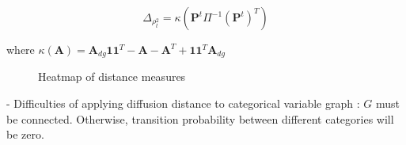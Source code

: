 \documentclass[12pt]{report}
\begin{document}
$$\Delta_{\rho^{2}_{t}} = \kappa(\textbf{P}^{t} \Pi^{-1} (\textbf{P}^{t})^{T} )$$
 
where $\kappa(\textbf{A}) = \textbf{A}_{dg} \textbf{1} \textbf{1}^{T} - \textbf{A} - \textbf{A}^{T} + \textbf{1} \textbf{1}^{T} \textbf{A}_{dg}$ 

 
\begin{figure}[H]
\captionsetup{format=plain}
\centering
{}
\caption{Heatmap of distance measures}
\label{fig:dist}    
\end{figure} 
 
  
- Difficulties of applying diffusion distance to categorical variable graph : $G$ must be connected. Otherwise, transition probability between different categories will be zero.  

 
\end{document}
